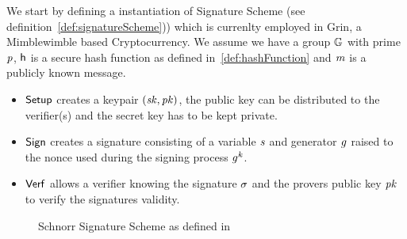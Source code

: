 We start by defining a instantiation of Signature Scheme (see definition~\ref{def:signatureScheme})) which is currenlty employed in Grin, a Mimblewimble based Cryptocurrency.
We assume we have a group $\mathbb{G}$ with prime $\mathit{p}$, $\mathsf{h}$ is a secure hash function as defined in~\ref{def:hashFunction} and $\mathit{m}$ is a publicly known message.\\
\begin{itemize}
    \item $\mathsf{Setup}$ creates a keypair $(\mathit{sk}, \mathit{pk})$, the public key can be distributed to the verifier(s) and the secret key has to be kept private. \\
    \item $\mathsf{Sign}$ creates a signature consisting of a variable $\mathit{s}$ and generator $\mathit{g}$ raised to the nonce used during the signing process $\mathit{g}^{\mathit{k}}$. \\
    \item $\mathsf{Verf}$ allows a verifier knowing the signature $\sigma$ and the provers public key $\mathit{pk}$ to verify the signatures validity. \\
\end{itemize}
\begin{figure}
    \fbox{
        \parbox{\textwidth}{
            \procedure[linenumbering, syntaxhighlight=auto]{$\procSetup{\varSecParam}$} {
                \varKey \sample \cnstIntegersPrimeWithoutZero{\varPrime} \\
                \pcreturn (\varSecKey \opAssign \varKey \opSeperate \varPubKey \opAssign \funGen{\varKey})
            }
            \procedure[linenumbering, syntaxhighlight=auto]{$\procSign{\varMsg}{\varSecKey}$}{
                \varNonce \sample \cnstIntegersPrimeWithoutZero{\varPrime} \\
                \varRand \opAssign \funGen{\varNonce} \\
                \varSchnorrChallenge \opAssign \funHash{\varMsg \opConc \varRand \opConc \varPubKey} \\
                \varS \opAssign \varNonce \opAddScalar \varSchnorrChallenge \opTimesScalar \varSecKey \\
                \pcreturn \varSignature \opAssign (\varS, \varRand)
            }
            \procedure[linenumbering, syntaxhighlight=auto]{$\procVerf{\varMsg}{\varSignature}{\varPubKey}$} {
                \varS \opAssign \opAccess{\varSignature}{\varS} \\
                \varRand \opAssign \opAccess{\varSignature}{\varRand} \\
                \varSchnorrChallenge \opAssign \funHash{\varMsg \opConc \varRand \opConc \varPubKey} \\
                \pcreturn \funGen{\varS} \opEq \opPointScalar{\varRand}{\varSchnorrChallenge} \opAddPoint \varPubKey
            }
        }
    }
    \caption{Schnorr Signature Scheme as defined in~\cite{schnorr1989efficient}}
    \label{fig:schnorr}
\end{figure}
